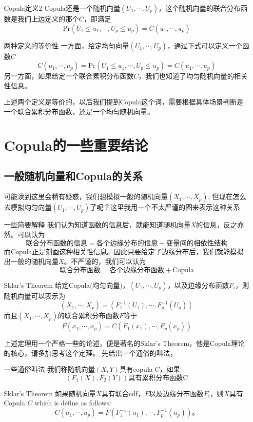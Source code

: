 \documentclass[12pt]{article}
\theoremstyle{definition}
\begin{document}
\begin{sdefinition}{Copula定义2}{}
Copula还是一个随机向量$(U_1,\cdots,U_p)$，这个随机向量的联合分布函数是我们上边定义的那个$C$，即满足
$$
\mathrm{Pr}(U_1\leq u_1,\cdots,U_p \leq u_p) = C(u_1,\cdots,u_p)
$$
\end{sdefinition}
\begin{stheorem}{两种定义的等价性}{}
一方面，给定均匀向量$(U_1,\cdots,U_p)$，通过下式可以定义一个函数$C$
$$
C(u_1,\cdots,u_p) = \mathrm{Pr}(U_1\leq u_1,\cdots,U_p \leq u_p) = C(u_1,\cdots,u_p)
$$
另一方面，如果给定一个联合累积分布函数$C$，我们也知道了均匀随机向量的相关性信息。
\end{stheorem}
\begin{sremark}{}{}
上述两个定义是等价的，以后我们提到Copula这个词，需要根据具体场景判断是一个联合累积分布函数，还是一个均匀随机向量。
\end{sremark}

\section{Copula的一些重要结论}
\subsection{一般随机向量和Copula的关系}
可能读到这里会稍有疑惑，我们想模拟一般的随机向量$(X_1,\cdots,X_p)$, 但现在怎么去模拟均匀向量$(U_1,\cdots,U_p)$了呢？这里我用一个不太严谨的图来表示这种关系
\begin{stheorem}{一些简要解释}{}
我们认为知道函数的信息后，就能知道随机向量$X$的信息，反之亦然。可以认为
$$
\text{联合分布函数的信息} = \text{各个边缘分布的信息}
 + \text{变量间的相依性结构}
$$
而Copula正是刻画这种相关性信息。因此只要给定了边缘分布后，我们就能模拟出一般的随机向量$X$。不严谨的，我们可以认为
$$
\text{联合分布函数} = \text{各个边缘分布函数} +  \text{Copula}
$$
\end{stheorem}

\begin{stheorem}{Sklar's Theorem}{}
给定Copula(均匀向量)，$(U_1,\cdots,U_p)$，以及边缘分布函数$F_i$，则随机向量可以表示为
$$
(X_1,\cdots,X_p) = (F_1^{-1}(U_1),\cdots,F_p^{-1}(U_p))
$$
而且$(X_1,\cdots,X_p)$的联合累积分布函数$F$等于
$$
F(x_1,\cdots,x_p) = C(F_1(x_1),\cdots,F_p(x_p))
$$
\end{stheorem}
上述定理用一个严格一些的论述，便是著名的Sklar's Theorem，他是Copula理论的核心，请多加思考这个定理。
先给出一个通俗的叫法，
\begin{sdefinition}{一些通俗叫法}{}
我们称随机向量$(X,Y)$具有copula $C$，如果
$$
(F_1(X),F_2(Y)) \text{具有累积分布函数C}
$$
\end{sdefinition}
\begin{stheorem}{Sklar's Theorem}{}
如果随机向量$X$具有联合cdf，$F$以及边缘分布函数$F_i$，则$X$具有Copula $C$ which is define as follows:
$$
C(u_1,\cdots,u_p) = F(F_1^{-1}(u_1),\cdots,F_p^{-1}(u_p))。
$$
\end{stheorem}
\end{document}
